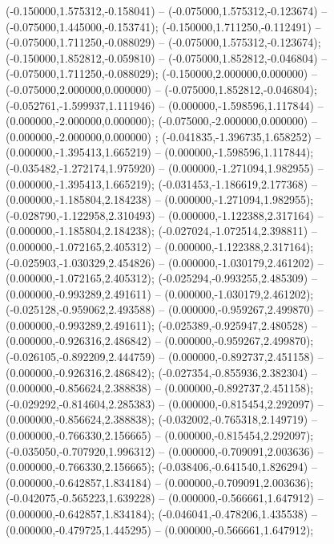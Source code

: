  (-0.150000,1.575312,-0.158041) -- (-0.075000,1.575312,-0.123674) -- (-0.075000,1.445000,-0.153741);
 (-0.150000,1.711250,-0.112491) -- (-0.075000,1.711250,-0.088029) -- (-0.075000,1.575312,-0.123674);
 (-0.150000,1.852812,-0.059810) -- (-0.075000,1.852812,-0.046804) -- (-0.075000,1.711250,-0.088029);
 (-0.150000,2.000000,0.000000) -- (-0.075000,2.000000,0.000000) -- (-0.075000,1.852812,-0.046804);
 (-0.052761,-1.599937,1.111946) -- (0.000000,-1.598596,1.117844) -- (0.000000,-2.000000,0.000000);
 (-0.075000,-2.000000,0.000000) -- (0.000000,-2.000000,0.000000) ;
 (-0.041835,-1.396735,1.658252) -- (0.000000,-1.395413,1.665219) -- (0.000000,-1.598596,1.117844);
 (-0.035482,-1.272174,1.975920) -- (0.000000,-1.271094,1.982955) -- (0.000000,-1.395413,1.665219);
 (-0.031453,-1.186619,2.177368) -- (0.000000,-1.185804,2.184238) -- (0.000000,-1.271094,1.982955);
 (-0.028790,-1.122958,2.310493) -- (0.000000,-1.122388,2.317164) -- (0.000000,-1.185804,2.184238);
 (-0.027024,-1.072514,2.398811) -- (0.000000,-1.072165,2.405312) -- (0.000000,-1.122388,2.317164);
 (-0.025903,-1.030329,2.454826) -- (0.000000,-1.030179,2.461202) -- (0.000000,-1.072165,2.405312);
 (-0.025294,-0.993255,2.485309) -- (0.000000,-0.993289,2.491611) -- (0.000000,-1.030179,2.461202);
 (-0.025128,-0.959062,2.493588) -- (0.000000,-0.959267,2.499870) -- (0.000000,-0.993289,2.491611);
 (-0.025389,-0.925947,2.480528) -- (0.000000,-0.926316,2.486842) -- (0.000000,-0.959267,2.499870);
 (-0.026105,-0.892209,2.444759) -- (0.000000,-0.892737,2.451158) -- (0.000000,-0.926316,2.486842);
 (-0.027354,-0.855936,2.382304) -- (0.000000,-0.856624,2.388838) -- (0.000000,-0.892737,2.451158);
 (-0.029292,-0.814604,2.285383) -- (0.000000,-0.815454,2.292097) -- (0.000000,-0.856624,2.388838);
 (-0.032002,-0.765318,2.149719) -- (0.000000,-0.766330,2.156665) -- (0.000000,-0.815454,2.292097);
 (-0.035050,-0.707920,1.996312) -- (0.000000,-0.709091,2.003636) -- (0.000000,-0.766330,2.156665);
 (-0.038406,-0.641540,1.826294) -- (0.000000,-0.642857,1.834184) -- (0.000000,-0.709091,2.003636);
 (-0.042075,-0.565223,1.639228) -- (0.000000,-0.566661,1.647912) -- (0.000000,-0.642857,1.834184);
 (-0.046041,-0.478206,1.435538) -- (0.000000,-0.479725,1.445295) -- (0.000000,-0.566661,1.647912);
